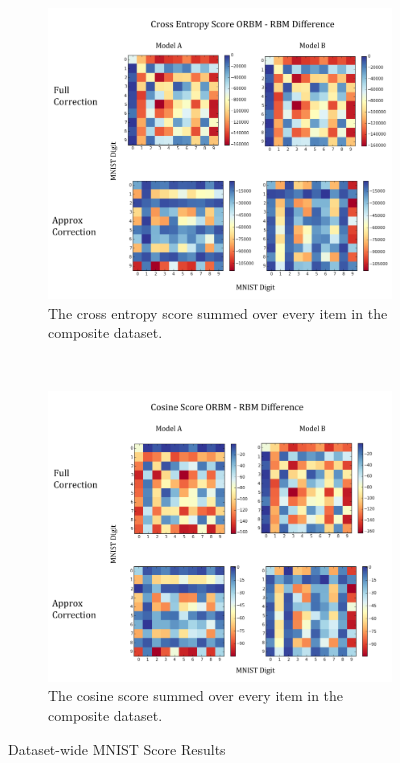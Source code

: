   \begin{figure}[h]
  \centering
  \begin{subfigure}[t]{0.45\textwidth}
      \includegraphics[width=\textwidth]{Assets/Cross-Entropy-Score.png}
      \caption{The cross entropy score summed over every item in the composite dataset.}
      \label{F:Cross-Entropy-MNIST}
  \end{subfigure}
  ~ %
  \begin{subfigure}[t]{0.45\textwidth}
      \includegraphics[width=\textwidth]{Assets/Cosine-Score.png}
      \caption{The cosine score summed over every item in the composite dataset.}
      \label{F:Cosine-MNIST}
  \end{subfigure}
  \caption{Dataset-wide MNIST Score Results }\label{fig:mnist-dataset-wide-results}
\end{figure}

